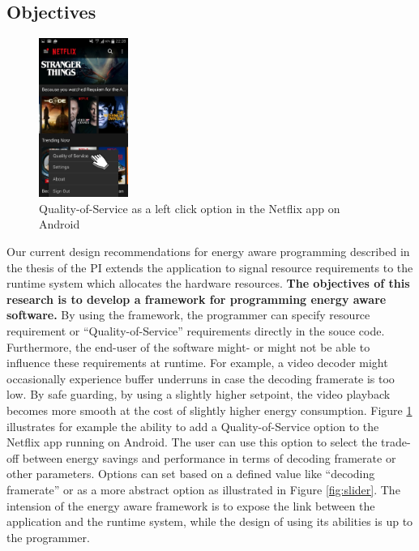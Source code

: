 \documentclass{article}
\begin{document}
\subsection{Objectives}
\begin{figure}
  \begin{center}
  \vspace{-0.8cm}
    \includegraphics[width=0.26\textwidth]{fig/netflix.png}
  \end{center}
  \caption{Quality-of-Service as a left click option in the Netflix app on Android}
  \label{fig:netflix}
  \vspace{1.5cm}
\end{figure}
Our current design recommendations for energy aware programming described in the thesis of the PI extends the application to signal resource requirements to the runtime system which allocates the hardware resources.
\textbf{The objectives of this research is to develop a framework for programming energy aware software.}
By using the framework, the programmer can specify resource requirement or ``Quality-of-Service'' requirements directly in the souce code.
Furthermore, the end-user of the software might- or might not be able to influence these requirements at runtime.
For example, a video decoder might occasionally experience buffer underruns in case the decoding framerate is too low.
By safe guarding, by using a slightly higher setpoint, the video playback becomes more smooth at the cost of slightly higher energy consumption.
Figure \ref{fig:netflix} illustrates for example the ability to add a Quality-of-Service option to the Netflix app running on Android.
The user can use this option to select the trade-off between energy savings and performance in terms of decoding framerate or other parameters. 
Options can set based on a defined value like ``decoding framerate'' or as a more abstract option as illustrated in Figure \ref{fig:slider}. 
The intension of the energy aware framework is to expose the link between the application and the runtime system, while the design of using its abilities is up to the programmer.
\end{document}
